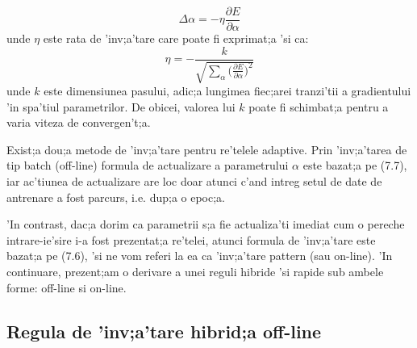 \begin{equation}
\Delta \alpha = - \eta \frac {\partial E} {\partial \alpha}
\end{equation}
unde $\eta$ este rata de 'inv;a'tare care poate fi exprimat;a 'si ca:
\begin{equation}
\eta = - \frac {k} {\sqrt {\displaystyle \sum_{\alpha} \Big(\frac {\partial E} {\partial \alpha}\Big)^{2}}}
\end{equation}
unde $k$ este dimensiunea pasului, adic;a lungimea fiec;arei tranzi'tii a gradientului 'in spa'tiul parametrilor. De obicei, valorea lui $k$ poate fi schimbat;a pentru a varia viteza de convergen't;a.
\par
Exist;a dou;a metode de 'inv;a'tare pentru re'telele adaptive. Prin 'inv;a'tarea de tip batch (off-line) formula de actualizare a parametrului $\alpha$ este bazat;a pe (7.7), iar ac'tiunea de actualizare are loc doar atunci c'and intreg setul de date de antrenare a fost parcurs, i.e. dup;a o epoc;a.
\par
'In contrast, dac;a dorim ca parametrii s;a fie actualiza'ti imediat cum o pereche intrare-ie'sire i-a fost prezentat;a re'telei, atunci formula de 'inv;a'tare este bazat;a pe (7.6), 'si ne vom referi la ea ca 'inv;a'tare pattern (sau on-line). 'In continuare, prezent;am o derivare a unei reguli hibride 'si rapide sub ambele forme: off-line si on-line.
\par
\subsection{Regula de 'inv;a'tare hibrid;a off-line}
\paragraph{}


